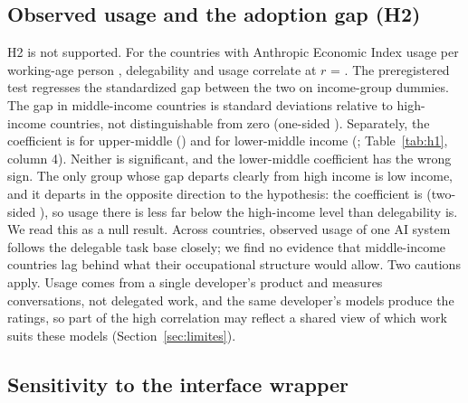 \subsection{Observed usage and the adoption gap (H2)}

H2 is not supported.
For the  countries with Anthropic Economic Index usage per working-age person \citep{aei2025economic}, delegability and usage correlate at $r$ = .
The preregistered test regresses the standardized gap between the two on income-group dummies.
The gap in middle-income countries is  standard deviations relative to high-income countries, not distinguishable from zero (one-sided ).
Separately, the coefficient is  for upper-middle () and  for lower-middle income (; Table~\ref{tab:h1}, column 4).
Neither is significant, and the lower-middle coefficient has the wrong sign.
The only group whose gap departs clearly from high income is low income, and it departs in the opposite direction to the hypothesis: the coefficient is  (two-sided ), so usage there is less far below the high-income level than delegability is.
We read this as a null result.
Across countries, observed usage of one AI system follows the delegable task base closely; we find no evidence that middle-income countries lag behind what their occupational structure would allow.
Two cautions apply.
Usage comes from a single developer's product and measures conversations, not delegated work, and the same developer's models produce the ratings, so part of the high correlation may reflect a shared view of which work suits these models (Section~\ref{sec:limites}).

\subsection{Sensitivity to the interface wrapper}

